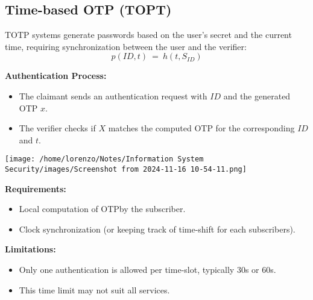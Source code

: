 \subsection{Time-based OTP (TOPT)}
\begin{minipage}{0.5\textwidth}
    TOTP systems generate passwords based on the user's secret and the current time, requiring synchronization between the user and the verifier:
    \[p(ID,t)\ =\ h(t,S_{ID})\]
    \begin{customquote}
        \textbf{Authentication Process:}
        \begin{itemize}
            \item The claimant sends an authentication request with \(ID\) and the generated OTP \(x\).
            \item The verifier checks if \(X\) matches the computed OTP for the corresponding \(ID\) and \(t\).
        \end{itemize}
    \end{customquote}
    
\end{minipage} 
\hspace{0.3cm}
\begin{minipage}{0.5\textwidth}
    \centering
    \texttt{[image: /home/lorenzo/Notes/Information System Security/images/Screenshot from 2024-11-16 10-54-11.png]}
\end{minipage}

\vspace{0.5cm}
\begin{customquote}
    \textbf{Requirements:}
    \begin{itemize}
        \item Local computation of OTPby the subscriber.
        \item Clock synchronization  (or keeping track of time-shift for each subscribers).
    \end{itemize}
\end{customquote}

\begin{customquote}
    \textbf{Limitations:}
    \begin{itemize}
        \item Only one authentication is allowed per time-slot, typically 30s or 60s.
        \item This time limit may not suit all services.
    \end{itemize}
\end{customquote}

